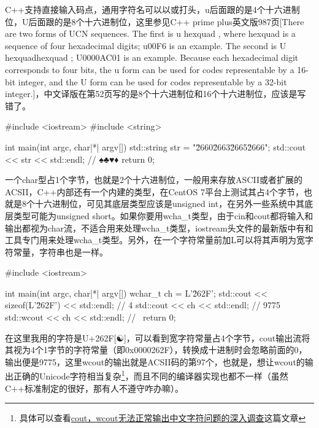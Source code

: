 C++支持直接输入\href{https://home.unicode.org/}{}码点，通用字符名可以以或打头，\mybackslash u后面跟的是4个十六进制位，\mybackslash U后面跟的是8个十六进制位，这里参见C++ prime plus英文版987页[There are two forms of UCN sequences. The first is \mybackslash u hexquad , where hexquad is a sequence of four hexadecimal digits; \mybackslash u00F6 is an example. The second is \mybackslash U hexquadhexquad ; \mybackslash U0000AC01 is an example. Because each hexadecimal digit corresponds to four bits, the \mybackslash u form can be used for codes representable by a 16-bit integer, and the \mybackslash U form can be used for codes representable by a 32-bit integer.]，中文译版在第52页写的是8个十六进制位和16个十六进制位，应该是写错了。

\begin{cpp}
#include <iostream>
#include <string>

int main(int argc, char|*| argv[]) {
    std::string str = "\u2660\u2663\u2665\u2666";
    std::cout << str << std::endl; // ♠♣♥♦
    return 0;
}
\end{cpp}

一个char型占1个字节，也就是2个十六进制位，一般用来存放ASCII或者扩展的ACSII，C++内部还有一个内建的类型，在CentOS 7平台上测试其占4个字节，也就是8个十六进制位，可见其底层类型应该是unsigned int，在另外一些系统中其底层类型可能为unsigned short。如果你要用wcha\_t类型，由于cin和cout都将输入和输出都视为char流，不适合用来处理wcha\_t类型，iostream头文件的最新版中有和工具专门用来处理wcha\_t类型。另外，在一个字符常量前加L可以将其声明为宽字符常量，字符串也是一样。

\begin{cpp}
#include <iostream>

int main(int argc, char|*| argv[]) {
    wchar_t ch = L'\u262F';
    std::cout << sizeof(L'\u262F') << std::endl; // 4
    std::cout << ch << std::endl; // 9775
    std::wcout << ch << std::endl; // \
    return 0;
}
\end{cpp}

在这里我用的字符是U+262F[☯]，可以看到宽字符常量占4个字节，cout输出流将其视为4个1字节的字符常量（即0x0000262F），转换成十进制时会忽略前面的0，输出便是9775，这里wcout的输出就是ACSII码的第97个，也就是\mybackslash ，想让wcout的输出正确的Unicode字符相当复杂\footnote{具体可以查看\href{https://www.cnblogs.com/zyl910/archive/2013/01/20/wchar_crtbug_01.html}{cout，wcout无法正常输出中文字符问题的深入调查}这篇文章}，而且不同的编译器实现也都不一样（虽然C++标准制定的很好，那有人不遵守咋办嘛）。

